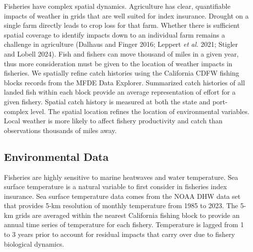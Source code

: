 \documentclass[
  letterpaper,
  DIV=11,
  numbers=noendperiod]{scrartcl}
\begin{document}
Fisheries have complex spatial dynamics. Agriculture has clear,
quantifiable impacts of weather in grids that are well suited for index
insurance. Drought on a single farm directly leads to crop loss for that
farm. Whether there is sufficient spatial coverage to identify impacts
down to an individual farm remains a challenge in agriculture (Dalhaus
and Finger 2016; Leppert \emph{et al.} 2021; Stigler and Lobell 2024).
Fish and fishers can move thousand of miles in a given year, thus more
consideration must be given to the location of weather impacts in
fisheries. We spatially refine catch histories using the California CDFW
fishing blocks records from the MFDE Data Explorer. Summarized catch
histories of all landed fish within each block provide an average
representation of effort for a given fishery. Spatial catch history is
measured at both the state and port-complex level. The spatial location
refines the location of environmental variables. Local weather is more
likely to affect fishery productivity and catch than observations
thousands of miles away.

\hypertarget{environmental-data}{%
\subsection{Environmental Data}\label{environmental-data}}

Fisheries are highly sensitive to marine heatwaves and water
temperature. Sea surface temperature is a natural variable to first
consider in fisheries index insurance. Sea surface temperature data
comes from the NOAA DHW data set that provides 5-km resolution of
monthly temperature from 1985 to 2023. The 5-km grids are averaged
within the nearest California fishing block to provide an annual time
series of temperature for each fishery. Temperature is lagged from 1 to
3 years prior to account for residual impacts that carry over due to
fishery biological dynamics.
\end{document}
